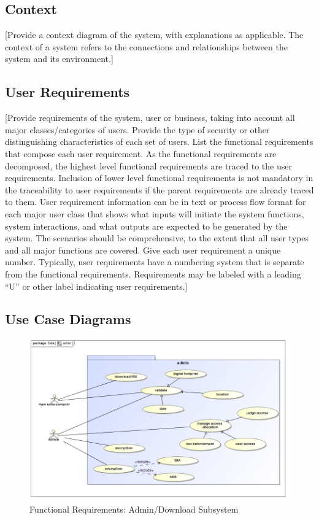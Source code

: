 \documentclass[a4paper,12pt]{article}
\begin{document}
\subsection{Context}
[Provide a context diagram of the system, with explanations as applicable.  The context of a system refers to the connections and relationships between the system and its environment.]

\subsection{User Requirements}
[Provide requirements of the system, user or business, taking into account all major classes/categories of users.  Provide the type of security or other distinguishing characteristics of each set of users.  List the functional requirements that compose each user requirement.  As the functional requirements are decomposed, the highest level functional requirements are traced to the user requirements.  Inclusion of lower level functional requirements is not mandatory in the traceability to user requirements if the parent requirements are already traced to them.
User requirement information can be in text or process flow format for each major user class that shows what inputs will initiate the system functions, system interactions, and what outputs are expected to be generated by the system.  The scenarios should be comprehensive, to the extent that all user types and all major functions are covered.  Give each user requirement a unique number.  Typically, user requirements have a numbering system that is separate from the functional requirements.  Requirements may be labeled with a leading “U” or other label indicating user requirements.]


\subsection{Use Case Diagrams}

\begin{figure}[H]
\includegraphics[width=1.0\textwidth]{images/admin.jpg}
\caption{Functional Requirements: Admin/Download Subsystem \label{overflow}}
\end{figure}
\end{document}
